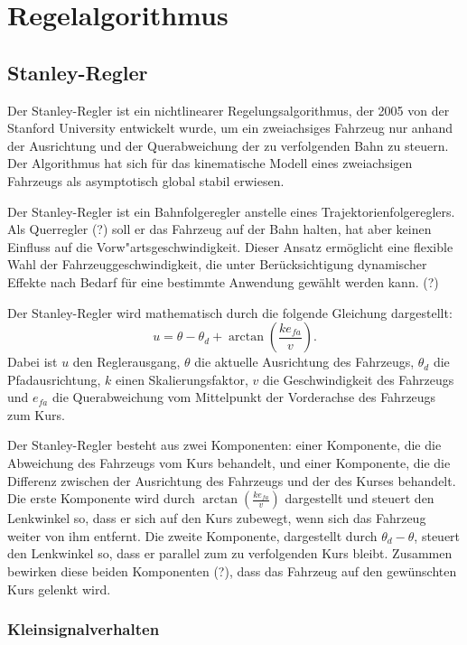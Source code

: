 \documentclass[arbeit=studie,oneside,BCOR=12mm]{ArbeitRST}
\begin{document}
\chapter{Regelalgorithmus}

\section{Stanley-Regler}

Der Stanley-Regler ist ein nichtlinearer Regelungsalgorithmus, der 2005 von
der Stanford University entwickelt wurde, um ein zweiachsiges Fahrzeug nur
anhand der Ausrichtung und der Querabweichung der zu verfolgenden Bahn zu
steuern. Der Algorithmus hat sich für das kinematische Modell eines
zweiachsigen Fahrzeugs als asymptotisch global stabil erwiesen.

Der Stanley-Regler ist ein Bahnfolgeregler anstelle eines
Trajektorienfolgereglers. Als Querregler (?) soll er das Fahrzeug auf der Bahn
halten, hat aber keinen Einfluss auf die Vorw"artsgeschwindigkeit. Dieser
Ansatz ermöglicht eine flexible Wahl der Fahrzeuggeschwindigkeit, die unter
Berücksichtigung dynamischer Effekte nach Bedarf für eine bestimmte Anwendung
gewählt werden kann. (?)

Der Stanley-Regler wird mathematisch durch die folgende Gleichung dargestellt:
\begin{equation} 
  u = \theta - \theta_d + \arctan\left(\frac{ke_{fa}}{v}\right).
  \label{eq:Stanley-Regler} 
\end{equation}
Dabei ist $u$ den Reglerausgang, $\theta$ die aktuelle Ausrichtung des Fahrzeugs,
$\theta_d$ die Pfadausrichtung, $k$ einen Skalierungsfaktor, $v$ die
Geschwindigkeit des Fahrzeugs und $e_{fa}$ die Querabweichung vom Mittelpunkt
der Vorderachse des Fahrzeugs zum Kurs.

Der Stanley-Regler besteht aus zwei Komponenten: einer Komponente, die die
Abweichung des Fahrzeugs vom Kurs behandelt, und einer Komponente, die die
Differenz zwischen der Ausrichtung des Fahrzeugs und der des Kurses behandelt.
Die erste Komponente wird durch $\arctan(\frac{ke_{fa}}{v})$ dargestellt und
steuert den Lenkwinkel so, dass er sich auf den Kurs zubewegt, wenn sich das
Fahrzeug weiter von ihm entfernt. Die zweite Komponente, dargestellt durch
$\theta_d - \theta$, steuert den Lenkwinkel so, dass er parallel zum zu
verfolgenden Kurs bleibt. Zusammen bewirken diese beiden Komponenten (?), dass
das Fahrzeug auf den gewünschten Kurs gelenkt wird.


\subsection{Kleinsignalverhalten}
\end{document}
